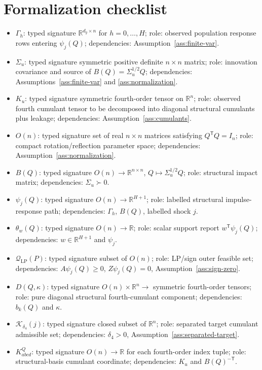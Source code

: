 \documentclass[11pt]{article}
\newcommand{\transpose}{\mathsf{T}}
\newcommand{\R}{\mathbb{R}}
\theoremstyle{definition}
\theoremstyle{plain}
\theoremstyle{remark}
\begin{document}
\section{Formalization checklist}
\begin{itemize}[leftmargin=*]
  \item \(\Gamma_h\): typed signature \(\R^{d_y\times n}\) for \(h=0,\ldots,H\); role: observed population response rows entering \(\psi_j(Q)\); dependencies: Assumption~\ref{ass:finite-var}.
  \item \(\Sigma_u\): typed signature symmetric positive definite \(n\times n\) matrix; role: innovation covariance and source of \(B(Q)=\Sigma_u^{1/2}Q\); dependencies: Assumptions~\ref{ass:finite-var} and \ref{ass:normalization}.
  \item \(K_u\): typed signature symmetric fourth-order tensor on \(\R^n\); role: observed fourth cumulant tensor to be decomposed into diagonal structural cumulants plus leakage; dependencies: Assumption~\ref{ass:cumulants}.
  \item \(O(n)\): typed signature set of real \(n\times n\) matrices satisfying \(Q^\transpose Q=I_n\); role: compact rotation/reflection parameter space; dependencies: Assumption~\ref{ass:normalization}.
  \item \(B(Q)\): typed signature \(O(n)\to\R^{n\times n}\), \(Q\mapsto\Sigma_u^{1/2}Q\); role: structural impact matrix; dependencies: \(\Sigma_u\succ0\).
  \item \(\psi_j(Q)\): typed signature \(O(n)\to\R^{H+1}\); role: labelled structural impulse-response path; dependencies: \(\Gamma_h\), \(B(Q)\), labelled shock \(j\).
  \item \(\theta_w(Q)\): typed signature \(O(n)\to\R\); role: scalar support report \(w^\transpose\psi_j(Q)\); dependencies: \(w\in\R^{H+1}\) and \(\psi_j\).
  \item \(\mathcal Q_{\mathrm{LP}}(P)\): typed signature subset of \(O(n)\); role: LP/sign outer feasible set; dependencies: \(A\psi_j(Q)\ge0\), \(Z\psi_j(Q)=0\), Assumption~\ref{ass:sign-zero}.
  \item \(D(Q,\kappa)\): typed signature \(O(n)\times\R^n\to\) symmetric fourth-order tensors; role: pure diagonal structural fourth-cumulant component; dependencies: \(b_k(Q)\) and \(\kappa\).
  \item \(\mathcal K_{\delta_4}(j)\): typed signature closed subset of \(\R^n\); role: separated target cumulant admissible set; dependencies: \(\delta_4>0\), Assumption~\ref{ass:separated-target}.
  \item \(K^Q_{abcd}\): typed signature \(O(n)\to\R\) for each fourth-order index tuple; role: structural-basis cumulant coordinate; dependencies: \(K_u\) and \(B(Q)^{-\transpose}\).

\end{itemize}
\end{document}
